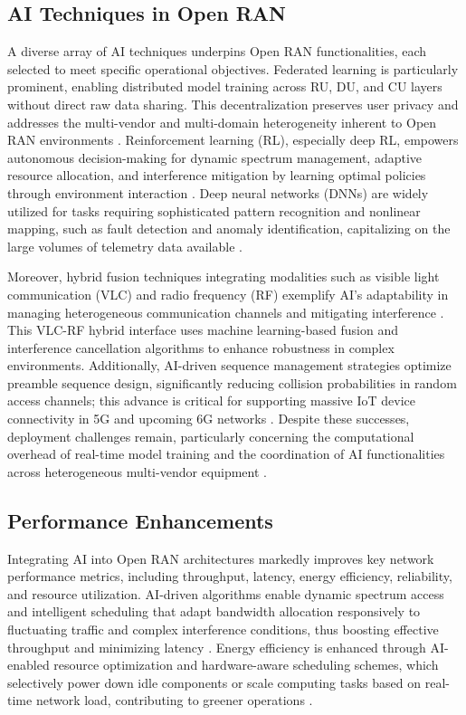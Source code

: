 \documentclass[sigconf]{acmart}
\begin{document}
\subsection{AI Techniques in Open RAN}

A diverse array of AI techniques underpins Open RAN functionalities, each selected to meet specific operational objectives. Federated learning is particularly prominent, enabling distributed model training across RU, DU, and CU layers without direct raw data sharing. This decentralization preserves user privacy and addresses the multi-vendor and multi-domain heterogeneity inherent to Open RAN environments \cite{ref54}. Reinforcement learning (RL), especially deep RL, empowers autonomous decision-making for dynamic spectrum management, adaptive resource allocation, and interference mitigation by learning optimal policies through environment interaction \cite{ref21,ref22}. Deep neural networks (DNNs) are widely utilized for tasks requiring sophisticated pattern recognition and nonlinear mapping, such as fault detection and anomaly identification, capitalizing on the large volumes of telemetry data available \cite{ref23,ref24}.

Moreover, hybrid fusion techniques integrating modalities such as visible light communication (VLC) and radio frequency (RF) exemplify AI’s adaptability in managing heterogeneous communication channels and mitigating interference \cite{ref25}. This VLC-RF hybrid interface uses machine learning-based fusion and interference cancellation algorithms to enhance robustness in complex environments. Additionally, AI-driven sequence management strategies optimize preamble sequence design, significantly reducing collision probabilities in random access channels; this advance is critical for supporting massive IoT device connectivity in 5G and upcoming 6G networks \cite{ref21}. Despite these successes, deployment challenges remain, particularly concerning the computational overhead of real-time model training and the coordination of AI functionalities across heterogeneous multi-vendor equipment \cite{ref49}.

\subsection{Performance Enhancements}

Integrating AI into Open RAN architectures markedly improves key network performance metrics, including throughput, latency, energy efficiency, reliability, and resource utilization. AI-driven algorithms enable dynamic spectrum access and intelligent scheduling that adapt bandwidth allocation responsively to fluctuating traffic and complex interference conditions, thus boosting effective throughput and minimizing latency \cite{ref54}. Energy efficiency is enhanced through AI-enabled resource optimization and hardware-aware scheduling schemes, which selectively power down idle components or scale computing tasks based on real-time network load, contributing to greener operations \cite{ref49}.
\end{document}
